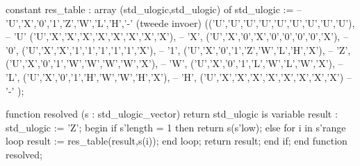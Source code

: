 constant res_table : array (std_ulogic,std_ulogic) of std_ulogic :=
 -- 'U','X','0','1','Z','W','L','H','-' (tweede invoer)
  (('U','U','U','U','U','U','U','U','U'), -- 'U'
   ('U','X','X','X','X','X','X','X','X'), -- 'X',
   ('U','X','0','X','0','0','0','0','X'), -- '0',
   ('U','X','X','1','1','1','1','1','X'), -- '1',
   ('U','X','0','1','Z','W','L','H','X'), -- 'Z',
   ('U','X','0','1','W','W','W','W','X'), -- 'W',
   ('U','X','0','1','L','W','L','W','X'), -- 'L',
   ('U','X','0','1','H','W','W','H','X'), -- 'H',
   ('U','X','X','X','X','X','X','X','X')  -- '-'
  );

function resolved (s : std_ulogic_vector) return std_ulogic is
variable result : std_ulogic := 'Z';
begin
    if s'length = 1 then
        return s(s'low);
    else
        for i in s'range loop
            result := res_table(result,s(i));
        end loop;
    return result;
    end if;
end function resolved;